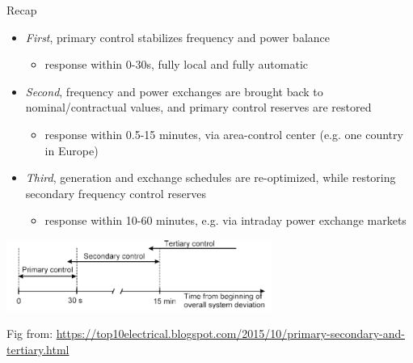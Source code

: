 \begin{frame}[allowframebreaks]{Recap}
    \begin{itemize}
        \item \textit{First}, primary control stabilizes frequency and power balance
        \begin{itemize}
            \item response within 0-30s, fully local and fully automatic
        \end{itemize}
        \item \textit{Second}, frequency and power exchanges are brought back to nominal/contractual values, and primary control reserves are restored
        \begin{itemize}
            \item response within 0.5-15 minutes, via area-control center (e.g. one country in Europe)
        \end{itemize}
        \item \textit{Third}, generation and exchange schedules are re-optimized, while restoring secondary frequency control reserves
        \begin{itemize}
            \item response within 10-60 minutes, e.g. via intraday power exchange markets
        \end{itemize}
    \end{itemize}
    \begin{center}
        \includegraphics[width=0.65\textwidth]{images/1-2-3-freq.png}
    \end{center}
    \tiny{Fig from: \url{https://top10electrical.blogspot.com/2015/10/primary-secondary-and-tertiary.html}}
\end{frame}

